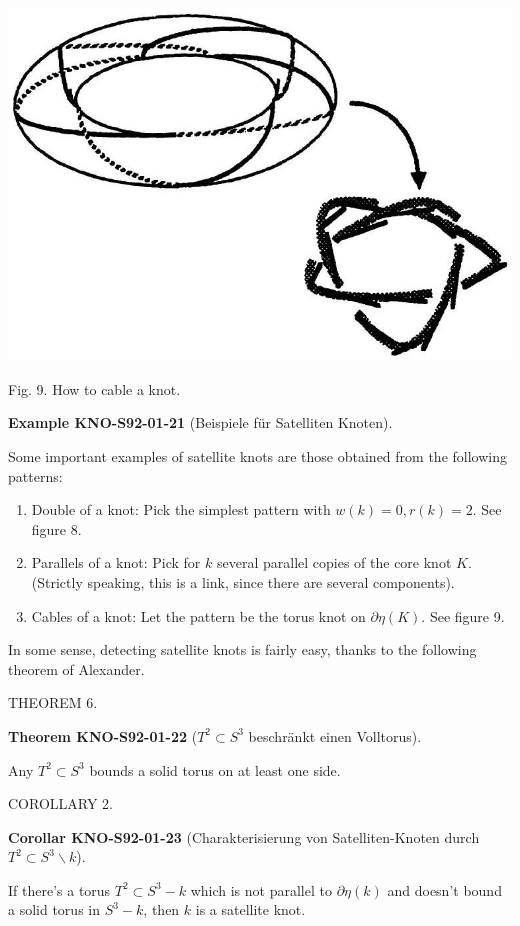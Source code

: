 \documentclass[10pt, letterpaper]{article}
\newcommand{\CustomHeading}[3]{%
  \par\medskip\noindent%
  \textbf{#1 #2} \textnormal{(#3)}.\enskip%
}
\newenvironment{THEO}[2]{\begin{unitbox}\CustomHeading{Theorem}{#1}{#2}}{\end{unitbox}}
\newenvironment{KORO}[2]{\begin{unitbox}\CustomHeading{Corollar}{#1}{#2}}{\end{unitbox}}
\newenvironment{EXA}[2]{\begin{unitbox}\CustomHeading{Example}{#1}{#2}}{\end{unitbox}}
\begin{document}
\includegraphics[scale=0.2, center]{2025_05_21_037de704f595ce642d3eg-082}


Fig. 9. How to cable a knot.


\begin{EXA}{KNO-S92-01-21}{Beispiele für Satelliten Knoten}
Some important examples of satellite knots are those obtained from the following patterns:

\begin{enumerate}
  \item Double of a knot: Pick the simplest pattern with $w(k)=0, r(k)=2$. See figure 8.
  \item Parallels of a knot: Pick for $k$ several parallel copies of the core knot $K$. (Strictly speaking, this is a link, since there are several components).
  \item Cables of a knot: Let the pattern be the torus knot on $\partial \eta(K)$. See figure 9.
\end{enumerate}
\end{EXA}

In some sense, detecting satellite knots is fairly easy, thanks to the following theorem of Alexander.

THEOREM 6. 

\begin{THEO}{KNO-S92-01-22}{$T^2\subset S^3$ beschränkt einen Volltorus}
Any $T^{2} \subset S^{3}$ bounds a solid torus on at least one side.
\end{THEO}


COROLLARY 2. 

\begin{KORO}{KNO-S92-01-23}{Charakterisierung von Satelliten-Knoten durch $T^2\subset S^3\backslash k$}
If there's a torus $T^{2} \subset S^{3}-k$ which is not parallel to $\partial \eta(k)$ and doesn't bound a solid torus in $S^{3}-k$, then $k$ is a satellite knot.
\end{KORO}
\end{document}
